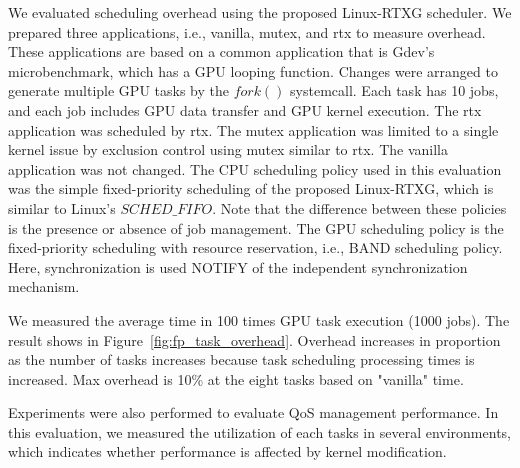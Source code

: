 We evaluated scheduling overhead using the proposed Linux-RTXG scheduler.
We prepared three applications, i.e., vanilla, mutex, and rtx to measure overhead.
These applications are based on a common application that is Gdev's microbenchmark, which has a GPU looping function.
Changes were arranged to generate multiple GPU tasks by the $fork()$ systemcall.
Each task has 10 jobs, and each job includes GPU data transfer and GPU kernel execution.
The rtx application was scheduled by rtx.
The mutex application was limited to a single kernel issue by exclusion control using mutex similar to rtx.
The vanilla application was not changed.
The CPU scheduling policy used in this evaluation was the simple fixed-priority scheduling of the proposed Linux-RTXG, which is similar to Linux's $SCHED\_FIFO$. Note that the difference between these policies is the presence or absence of job management.
The GPU scheduling policy is the fixed-priority scheduling with resource reservation, i.e., BAND scheduling policy.
Here, synchronization is used NOTIFY of the independent synchronization mechanism.

We measured the average time in 100 times GPU task execution (1000 jobs).
The result shows in Figure~\ref{fig:fp_task_overhead}.
Overhead increases in proportion as the number of tasks increases because task scheduling processing times is increased.
Max overhead is 10\% at the eight tasks based on "vanilla" time.

Experiments were also performed to evaluate QoS management performance.
In this evaluation, we measured the utilization of each tasks in several environments,
which indicates whether performance is affected by kernel modification.

